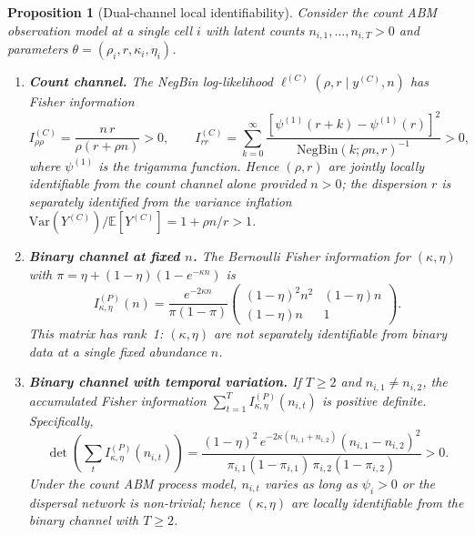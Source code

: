 \documentclass[review,12pt]{elsarticle}
\newtheorem{proposition}[theorem]{Proposition}
\theoremstyle{definition}
\begin{document}
\begin{proposition}[Dual-channel local identifiability]\label{prop:identif-dual}
Consider the count ABM observation model at a single cell $i$ with latent counts
$n_{i,1},\ldots,n_{i,T}>0$ and parameters
$\theta=(\rho_i,r,\kappa_i,\eta_i)$.

\begin{enumerate}[label=(\roman*)]
\item \textbf{Count channel.}
The NegBin log-likelihood $\ell^{(C)}(\rho,r\mid y^{(C)},n)$ has Fisher
information
\[
I^{(C)}_{\rho\rho}=\frac{n\,r}{\rho(r+\rho n)}>0,
\qquad
I^{(C)}_{rr}=\sum_{k=0}^{\infty}
\frac{[\psi^{(1)}(r+k)-\psi^{(1)}(r)]^2}
     {\mathrm{NegBin}(k;\rho n,r)^{-1}}>0,
\]
where $\psi^{(1)}$ is the trigamma function.  Hence $(\rho,r)$ are jointly
locally identifiable from the count channel alone provided $n>0$; the
dispersion $r$ is separately identified from the variance inflation
$\mathrm{Var}(Y^{(C)})/\mathbb{E}[Y^{(C)}]=1+\rho n/r>1$.

\item \textbf{Binary channel at fixed $n$.}
The Bernoulli Fisher information for $(\kappa,\eta)$ with
$\pi=\eta+(1-\eta)(1-e^{-\kappa n})$ is
\[
I^{(P)}_{\kappa,\eta}(n)
=\frac{e^{-2\kappa n}}{\pi(1-\pi)}
\begin{pmatrix}(1-\eta)^2n^2 & (1-\eta)n \\ (1-\eta)n & 1\end{pmatrix}.
\]
This matrix has rank~1: $(\kappa,\eta)$ are \emph{not} separately
identifiable from binary data at a single fixed abundance $n$.

\item \textbf{Binary channel with temporal variation.}
If $T\ge 2$ and $n_{i,1}\ne n_{i,2}$, the accumulated Fisher information
$\sum_{t=1}^T I^{(P)}_{\kappa,\eta}(n_{i,t})$ is positive definite.
Specifically,
\[
\det\!\left(\sum_t I^{(P)}_{\kappa,\eta}(n_{i,t})\right)
=\frac{(1-\eta)^2\,e^{-2\kappa(n_{i,1}+n_{i,2})}(n_{i,1}-n_{i,2})^2}
      {\pi_{i,1}(1-\pi_{i,1})\,\pi_{i,2}(1-\pi_{i,2})}
>0.
\]
Under the count ABM process model, $n_{i,t}$ varies as long as
$\psi_i>0$ or the dispersal network is non-trivial; hence $(\kappa,\eta)$
are locally identifiable from the binary channel with $T\ge 2$.


\end{enumerate}
\end{proposition}
\end{document}
